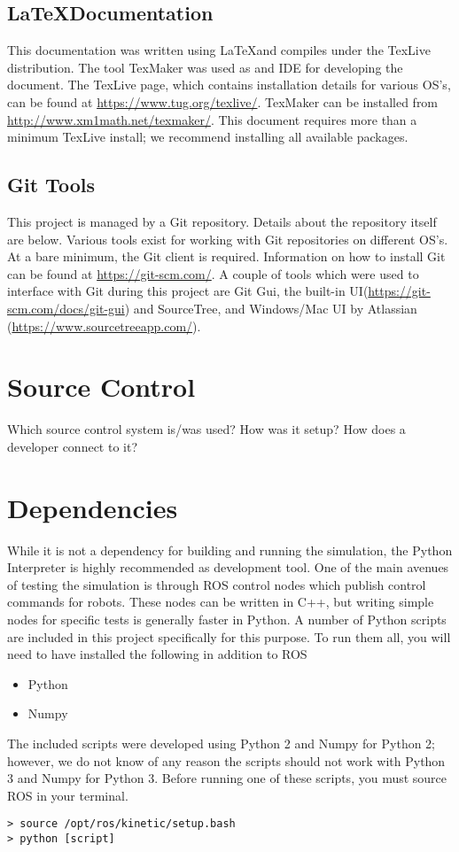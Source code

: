 \subsection{\LaTeX Documentation}
This documentation was written using \LaTeX and compiles under the TexLive distribution. The tool TexMaker was used as and IDE for developing the document.
The TexLive page, which contains installation details for various OS's, can be found at \url{https://www.tug.org/texlive/}. TexMaker can be installed from \url{http://www.xm1math.net/texmaker/}. This document requires more than a minimum TexLive install; we recommend installing all available packages.

\subsection{Git Tools}
This project is managed by a Git repository. Details about the repository itself are below. Various tools exist for working with Git repositories on different OS's. At a bare minimum, the Git client is required. Information on how to install Git can be found at \url{https://git-scm.com/}. A couple of tools which were used to interface with Git during this project are Git Gui, the built-in UI(\url{https://git-scm.com/docs/git-gui}) and SourceTree, and Windows/Mac UI by Atlassian (\url{https://www.sourcetreeapp.com/}).
\section{Source  Control}
Which source control system is/was used?  How was it setup?  How does a developer 
connect to it? 

\section{Dependencies}
While it is not a dependency for building and running the simulation, the Python Interpreter is highly recommended as development tool. One of the main avenues of testing the simulation is through ROS control nodes which publish control commands for robots. These nodes can be written in C++, but writing simple nodes for specific tests is generally faster in Python. A number of Python scripts are included in this project specifically for this purpose. To run them all, you will need to have installed the following in addition to ROS
\begin{itemize}
	\item Python
	\item Numpy
\end{itemize}
The included scripts were developed using Python 2 and Numpy for Python 2; however, we do not know of any reason the scripts should not work with Python 3 and Numpy for Python 3.
Before running one of these scripts, you must source ROS in your terminal.
\begin{lstlisting}
> source /opt/ros/kinetic/setup.bash
> python [script]
\end{lstlisting}

